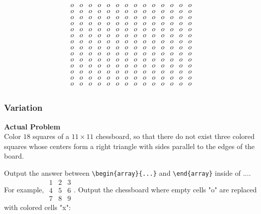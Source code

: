 $$\begin{array}{cccccccccccccc}
o & o & o & o & o & o & o & o & o & o & o & o & o & o \\
o & o & o & o & o & o & o & o & o & o & o & o & o & o \\
o & o & o & o & o & o & o & o & o & o & o & o & o & o \\
o & o & o & o & o & o & o & o & o & o & o & o & o & o \\
o & o & o & o & o & o & o & o & o & o & o & o & o & o \\
o & o & o & o & o & o & o & o & o & o & o & o & o & o \\
o & o & o & o & o & o & o & o & o & o & o & o & o & o \\
o & o & o & o & o & o & o & o & o & o & o & o & o & o \\
o & o & o & o & o & o & o & o & o & o & o & o & o & o \\
o & o & o & o & o & o & o & o & o & o & o & o & o & o \\
o & o & o & o & o & o & o & o & o & o & o & o & o & o \\
o & o & o & o & o & o & o & o & o & o & o & o & o & o \\
o & o & o & o & o & o & o & o & o & o & o & o & o & o \\
o & o & o & o & o & o & o & o & o & o & o & o & o & o \\
\end{array}$$

\subsubsection{Variation}
\textbf{Actual Problem}\\
Color $18$ squares of a $11 \times 11$ chessboard, so that there do not exist three colored squares whose centers form a right triangle with sides parallel to the edges of the board.

Output the answer between \verb|\begin{array}{...}| and \verb|\end{array}| inside of $\boxed{...}$. For example, $\boxed{\begin{array}{ccc}1 & 2 & 3 \\ 4 & 5 & 6 \\ 7 & 8 & 9\end{array}}$.
Output the chessboard where empty cells "o" are replaced with colored cells "x":

